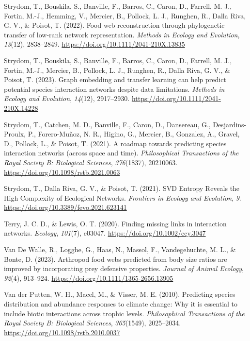 \documentclass[
]{article}
\newlength{\cslhangindent}
\newenvironment{CSLReferences}[2] %
 {\begin{list}{}{%
  \setlength{\itemindent}{0pt}
  \setlength{\leftmargin}{0pt}
  \setlength{\parsep}{0pt}
  \ifodd #1
   \setlength{\leftmargin}{\cslhangindent}
   \setlength{\itemindent}{-1\cslhangindent}
  \fi
  \setlength{\itemsep}{#2\baselineskip}}}
 {\end{list}}
\begin{document}
\begin{CSLReferences}{1}{0}
Strydom, T., Bouskila, S., Banville, F., Barros, C., Caron, D., Farrell,
M. J., Fortin, M.-J., Hemming, V., Mercier, B., Pollock, L. J., Runghen,
R., Dalla Riva, G. V., \& Poisot, T. (2022). Food web reconstruction
through phylogenetic transfer of low-rank network representation.
\emph{Methods in Ecology and Evolution}, \emph{13}(12), 2838--2849.
\url{https://doi.org/10.1111/2041-210X.13835}

Strydom, T., Bouskila, S., Banville, F., Barros, C., Caron, D., Farrell,
M. J., Fortin, M.-J., Mercier, B., Pollock, L. J., Runghen, R., Dalla
Riva, G. V., \& Poisot, T. (2023). Graph embedding and transfer learning
can help predict potential species interaction networks despite data
limitations. \emph{Methods in Ecology and Evolution}, \emph{14}(12),
2917--2930. \url{https://doi.org/10.1111/2041-210X.14228}

Strydom, T., Catchen, M. D., Banville, F., Caron, D., Dansereau, G.,
Desjardins-Proulx, P., Forero-Muñoz, N. R., Higino, G., Mercier, B.,
Gonzalez, A., Gravel, D., Pollock, L., \& Poisot, T. (2021). A roadmap
towards predicting species interaction networks (across space and time).
\emph{Philosophical Transactions of the Royal Society B: Biological
Sciences}, \emph{376}(1837), 20210063.
\url{https://doi.org/10.1098/rstb.2021.0063}

Strydom, T., Dalla Riva, G. V., \& Poisot, T. (2021). {SVD Entropy
Reveals} the {High Complexity} of {Ecological Networks}. \emph{Frontiers
in Ecology and Evolution}, \emph{9}.
\url{https://doi.org/10.3389/fevo.2021.623141}

Terry, J. C. D., \& Lewis, O. T. (2020). Finding missing links in
interaction networks. \emph{Ecology}, \emph{101}(7), e03047.
\url{https://doi.org/10.1002/ecy.3047}

Van De Walle, R., Logghe, G., Haas, N., Massol, F., Vandegehuchte, M.
L., \& Bonte, D. (2023). Arthropod food webs predicted from body size
ratios are improved by incorporating prey defensive properties.
\emph{Journal of Animal Ecology}, \emph{92}(4), 913--924.
\url{https://doi.org/10.1111/1365-2656.13905}

Van der Putten, W. H., Macel, M., \& Visser, M. E. (2010). Predicting
species distribution and abundance responses to climate change: Why it
is essential to include biotic interactions across trophic levels.
\emph{Philosophical Transactions of the Royal Society B: Biological
Sciences}, \emph{365}(1549), 2025--2034.
\url{https://doi.org/10.1098/rstb.2010.0037}


\end{CSLReferences}
\end{document}
